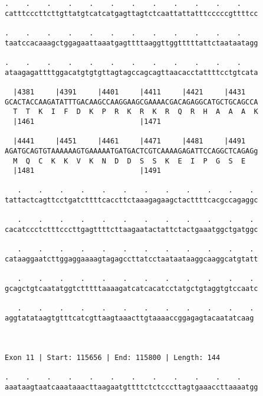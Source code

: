 \documentclass{article}
\begin{document}
\begin{Verbatim}
.    .    .    .    .    .    .    .    .    .    .    .    
catttcccttcttgttatgtcatcatgagttagtctcaattattatttcccccgttttcc
                                                            
.    .    .    .    .    .    .    .    .    .    .    .    
taatccacaaagctggagaattaaatgagttttaaggttggtttttattctaataatagg
                                                            
.    .    .    .    .    .    .    .    .    .    .    .    
ataagagattttggacatgtgtgttagtagccagcagttaacacctattttcctgtcata
                                                            
  |4381     |4391     |4401     |4411     |4421     |4431   
GCACTACCAAGATATTTGACAAGCCAAGGAAGCGAAAACGACAGAGGCATGCTGCAGCCA
  T  T  K  I  F  D  K  P  R  K  R  K  R  Q  R  H  A  A  A  K
  |1461                         |1471                       
  
  |4441     |4451     |4461     |4471     |4481     |4491   
AGATGCAGTGTAAAAAAGTGAAAAATGATGACTCGTCAAAAGAGATTCCAGGCTCAGAGg
  M  Q  C  K  K  V  K  N  D  D  S  S  K  E  I  P  G  S  E   
  |1481                         |1491                       
  
   .    .    .    .    .    .    .    .    .    .    .    . 
tattactcagttcctgatcttttcaccttctaaagagaagctacttttcacgccagaggc
                                                            
   .    .    .    .    .    .    .    .    .    .    .    . 
cacatccctctttcccttgagttttcttaagaatactattctactgaaatggctgatggc
                                                            
   .    .    .    .    .    .    .    .    .    .    .    . 
cataaggaatcttggaggaaaagtagagccttatcctaataataaggcaaggcatgtatt
                                                            
   .    .    .    .    .    .    .    .    .    .    .    . 
gcagctgtcaatatggtctttttaaaagatcatcacatcctatgctgtaggtgtccaatc
                                                            
   .    .    .    .    .    .    .    .    .    .    .    .
aggtatataagtgtttcatcgttaagtaaacttgtaaaaccggagagtacaatatcaag
                                                           
                                                           
 
Exon 11 | Start: 115656 | End: 115800 | Length: 144
 
.    .    .    .    .    .    .    .    .    .    .    .    
aaataagtaatcaaataaacttaagaatgttttctctcccttagtgaaaccttaaaatgg
                                                            

\end{Verbatim}
\end{document}
